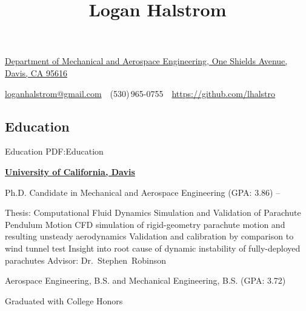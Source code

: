 \documentclass[letterpaper,MMMyyyy,nonstop]{simpleresumecv}
\makeatletter
\newcommand{\CVAuthor}{Logan Halstrom}
\newcommand{\CVWebpage}{https://github.com/lhalstro}
\newcommand{\CVEmail}{loganhalstrom@gmail.com}
\makeatother
\begin{document}

\title{\CVAuthor}

\begin{subtitle}
\href{https://www.google.com/maps/place/1+Shields+Ave,+Davis,+CA+95616}
{Department of Mechanical and Aerospace Engineering, One Shields Avenue, Davis, CA 95616}
\par
\href{mailto:\CVEmail}
{\CVEmail}
\,\SubBulletSymbol\,
(530)\,965-0755
\,\SubBulletSymbol\,
\href{\CVWebpage}
{\CVWebpage}
\end{subtitle}

\begin{body}


\section
{Education}
{Education}
{PDF:Education}

\href{http://mae.ucdavis.edu/}
{\textbf{University of California, Davis}}

\GapNoBreak
\BulletItem
Ph.D. Candidate in
{Mechanical and Aerospace Engineering} (GPA: 3.86)
\hfill
{} --
\begin{detail}
\SubItem
Thesis:
{Computational Fluid Dynamics Simulation and Validation of Parachute Pendulum Motion}
\SubBulletItem
CFD simulation of rigid-geometry parachute motion and resulting unsteady aerodynamics
\SubBulletItem
Validation and calibration by comparison to wind tunnel test
\SubBulletItem
Insight into root cause of dynamic instability of fully-deployed parachutes
\SubItem
Advisor:
Dr.~Stephen~Robinson
\end{detail}

\GapNoBreak
\BulletItem
Aerospace Engineering, B.S. and Mechanical Engineering, B.S. (GPA: 3.72)
\hfill
{}
\begin{detail}
\SubBulletItem
Graduated with College Honors
\end{detail}



\end{body}
\end{document}
